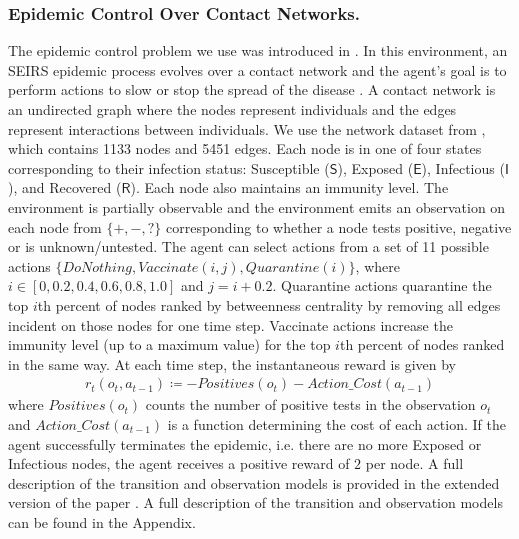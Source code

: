 \documentclass[letterpaper]{article} %
\newcommand{\sS}{\mathsf{S}}
\newcommand{\sE}{\mathsf{E}}
\newcommand{\sI}{\mathsf{I}}
\newcommand{\sR}{\mathsf{R}}
\newcommand{\DoNothing}{\mathit{DoNothing}}
\newcommand{\Vaccinate}{\mathit{Vaccinate}}
\newcommand{\Quarantine}{\mathit{Quarantine}}
\theoremstyle{definition}
\begin{document}
\subsubsection{Epidemic Control Over Contact Networks.}
The epidemic control problem we use was introduced in \cite{yang-zhao2022a}.
In this environment, an SEIRS epidemic process evolves over a contact network and the agent's goal is to perform actions to slow or stop the spread of the disease \cite{Pastor:2015,Nowzari:2016,Newman:2018}.
A contact network is an undirected graph where the nodes represent individuals and the edges represent interactions between individuals.
We use the network dataset from
\cite{RN15,GDDG03}, which contains 1133 nodes and 5451 edges.
Each node is in one of four states corresponding to their infection status: Susceptible ($\sS$), Exposed ($\sE$), Infectious ($\sI$), and Recovered ($\sR$). Each node also maintains an immunity level.
The environment is partially observable and the environment emits an observation on each node from $\{+, -, ?\}$ corresponding to whether a node tests positive, negative or is unknown/untested. The agent can select actions from a set of 11 possible actions  $\{ \DoNothing, \Vaccinate(i, j), \Quarantine(i) \}$, where $i \in [0, 0.2, 0.4, 0.6, 0.8, 1.0]$ and $j = i+0.2$.
Quarantine actions quarantine the top $i$th percent of nodes ranked by betweenness centrality by removing all edges incident on those nodes for one time step.
Vaccinate actions increase the immunity level (up to a maximum value) for the top $i$th percent of nodes ranked in the same way. 
At each time step, the instantaneous reward is given by
\begin{align*}
    r_t(o_t, a_{t-1}) \coloneqq -Positives(o_t) - Action\_Cost(a_{t-1})
\end{align*}
where $Positives(o_t)$ counts the number of positive tests in the observation $o_t$ and $Action\_Cost(a_{t-1})$ is a function determining the cost of each action. If the agent successfully terminates the epidemic, i.e. there are no more Exposed or Infectious nodes, the agent receives a positive reward of $2$ per node.
\ifpaper
A full description of the transition and observation models is provided in the extended version of the paper \cite{yang2023dynamic}.
\fi
\ifarxiv
A full description of the transition and observation models can be found in the Appendix.
\fi
\end{document}
